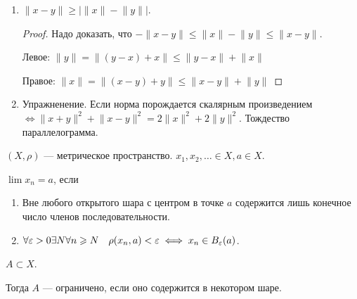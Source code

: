 \begin{properties}
\begin{enumerate}
\begin{proof}
                 $\rho(y, x) = \lVert y-x \rVert = \lVert (-1)(x-y) \rVert = |-1| \lVert x - y \rVert = \rho(x, y)$.

                  $\rho(x, z) \le \rho(x, y) + \rho(y, z)$: $\lVert (x-y) + (y-z) \rVert = \lVert x-z\rVert \le \lVert x - y \rVert + \lVert y-z \rVert$.
            \end{proof}
        \item $\lVert x - y \rVert \ge |\lVert x \rVert - \lVert y \rVert |$.
            \begin{proof}
                Надо доказать, что $-\lVert x - y \rVert \le \lVert x \rVert - \lVert y \rVert \le \lVert x - y \rVert$.

                Левое: $\lVert y \rVert = \lVert (y - x) + x \rVert \le \lVert y - x \rVert + \lVert x \rVert$

                Правое: $\lVert x \rVert = \lVert (x - y) + y \rVert \le \lVert x - y \rVert + \lVert y \rVert$

            \end{proof}
        \item Упражненение. Если норма порождается скалярным произведением $\iff \lVert x+y\rVert^2 + \lVert x-y\rVert^2 = 2\lVert x\rVert^2 + 2\lVert y \rVert^2$. Тождество параллелограмма.
    \end{enumerate}
\end{properties}
\begin{definition}
    $(X, \rho)$ --- метрическое пространство.  $x_1, x_2, \ldots \in X, a \in X$.

    $\lim x_n = a$, если
     \begin{enumerate}
         \item Вне любого открытого шара с центром в точке  $a$ содержится лишь конечное число членов последовательности.
         \item  $\forall \varepsilon > 0 \exists N \forall n \geqslant N\quad \rho(x_n, a) < \varepsilon \iff x_n \in B_\varepsilon(a)$.
    \end{enumerate}
\end{definition}
\begin{definition}
    $A \subset X$. 

    Тогда  $A$ --- ограничено, если оно содержится в некотором шаре.
\end{definition}

